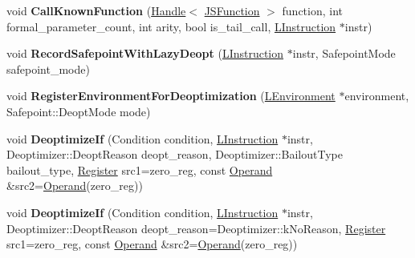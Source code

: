 \begin{DoxyCompactItemize}
\item 
void {\bfseries Call\+Known\+Function} (\hyperlink{classv8_1_1internal_1_1_handle}{Handle}$<$ \hyperlink{classv8_1_1internal_1_1_j_s_function}{J\+S\+Function} $>$ function, int formal\+\_\+parameter\+\_\+count, int arity, bool is\+\_\+tail\+\_\+call, \hyperlink{classv8_1_1internal_1_1_l_instruction}{L\+Instruction} $\ast$instr)\hypertarget{classv8_1_1internal_1_1_l_code_gen_adec87ca608c3363d2fa40b37952378b9}{}\label{classv8_1_1internal_1_1_l_code_gen_adec87ca608c3363d2fa40b37952378b9}

\item 
void {\bfseries Record\+Safepoint\+With\+Lazy\+Deopt} (\hyperlink{classv8_1_1internal_1_1_l_instruction}{L\+Instruction} $\ast$instr, Safepoint\+Mode safepoint\+\_\+mode)\hypertarget{classv8_1_1internal_1_1_l_code_gen_ae96e1ea2617dfdd8a23b554d85bdd250}{}\label{classv8_1_1internal_1_1_l_code_gen_ae96e1ea2617dfdd8a23b554d85bdd250}

\item 
void {\bfseries Register\+Environment\+For\+Deoptimization} (\hyperlink{classv8_1_1internal_1_1_l_environment}{L\+Environment} $\ast$environment, Safepoint\+::\+Deopt\+Mode mode)\hypertarget{classv8_1_1internal_1_1_l_code_gen_a8e3566b9bf7194223c47e7dac6fd6a10}{}\label{classv8_1_1internal_1_1_l_code_gen_a8e3566b9bf7194223c47e7dac6fd6a10}

\item 
void {\bfseries Deoptimize\+If} (Condition condition, \hyperlink{classv8_1_1internal_1_1_l_instruction}{L\+Instruction} $\ast$instr, Deoptimizer\+::\+Deopt\+Reason deopt\+\_\+reason, Deoptimizer\+::\+Bailout\+Type bailout\+\_\+type, \hyperlink{structv8_1_1internal_1_1_register}{Register} src1=zero\+\_\+reg, const \hyperlink{classv8_1_1internal_1_1_operand}{Operand} \&src2=\hyperlink{classv8_1_1internal_1_1_operand}{Operand}(zero\+\_\+reg))\hypertarget{classv8_1_1internal_1_1_l_code_gen_a9dab88efe856f5f85e8693d7f20341cf}{}\label{classv8_1_1internal_1_1_l_code_gen_a9dab88efe856f5f85e8693d7f20341cf}

\item 
void {\bfseries Deoptimize\+If} (Condition condition, \hyperlink{classv8_1_1internal_1_1_l_instruction}{L\+Instruction} $\ast$instr, Deoptimizer\+::\+Deopt\+Reason deopt\+\_\+reason=Deoptimizer\+::k\+No\+Reason, \hyperlink{structv8_1_1internal_1_1_register}{Register} src1=zero\+\_\+reg, const \hyperlink{classv8_1_1internal_1_1_operand}{Operand} \&src2=\hyperlink{classv8_1_1internal_1_1_operand}{Operand}(zero\+\_\+reg))\hypertarget{classv8_1_1internal_1_1_l_code_gen_a5a7b7d53ff3fa6398730855c7c65bd6c}{}\label{classv8_1_1internal_1_1_l_code_gen_a5a7b7d53ff3fa6398730855c7c65bd6c}


\end{DoxyCompactItemize}
